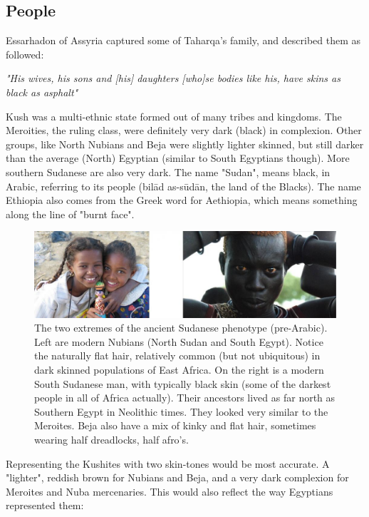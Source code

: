 \documentclass[a4paper,12pt]{scrreprt}
\begin{document}
\subsection{People}

Essarhadon of Assyria captured some of Taharqa's family, and described them as followed: 

\begin{center}
\textit{"His wives, his sons and [his] daughters [who]se bodies like his, have skins as black as asphalt"}\\[12pt]
\end{center}

Kush was a multi-ethnic state formed out of many tribes and kingdoms. The Meroities, the ruling class, were definitely very dark (black) in complexion. Other groups, like North Nubians and Beja were slightly lighter skinned, but still darker than the average (North) Egyptian (similar to South Egyptians though). More southern Sudanese are also very dark. The name "Sudan", means black, in Arabic, referring to its people (bilād as-sūdān, the land of the Blacks). The name Ethiopia also comes from the Greek word for Aethiopia, which means something along the line of "burnt face".

\begin{figure}[H]
	\centering
	\includegraphics[width=\textwidth]{img/people/skin_color_variances}
	\caption{ The two extremes of the ancient Sudanese phenotype (pre-Arabic). Left are modern Nubians (North Sudan and South Egypt). Notice the naturally flat hair, relatively common (but not ubiquitous) in dark skinned populations of East Africa. On the right is a modern South Sudanese man, with typically black skin (some of the darkest people in all of Africa actually). Their ancestors lived as far north as Southern Egypt in Neolithic times. They looked very similar to the Meroites. Beja also have a mix of kinky and flat hair, sometimes wearing half dreadlocks, half afro's.}
\end{figure}

Representing the Kushites with two skin-tones would be most accurate. A "lighter", reddish brown for Nubians and Beja, and a very dark complexion for Meroites and Nuba mercenaries. This would also reflect the way Egyptians represented them:    
\end{document}
